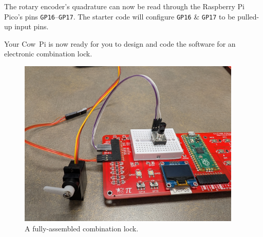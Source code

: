 The rotary encoder's quadrature can now be read through the Raspberry Pi Pico's pins \texttt{GP16}--\texttt{GP17}.
The starter code will configure \texttt{GP16} \& \texttt{GP17} to be pulled-up input pins.


\vspace{1cm}

Your Cow~Pi is now ready for you to design and code the software for an electronic combination lock.

\begin{figure}[h]
    \centering
    \includegraphics[height=8cm]{hardware/combolock}
    \caption{A fully-assembled combination lock.}
\end{figure}
